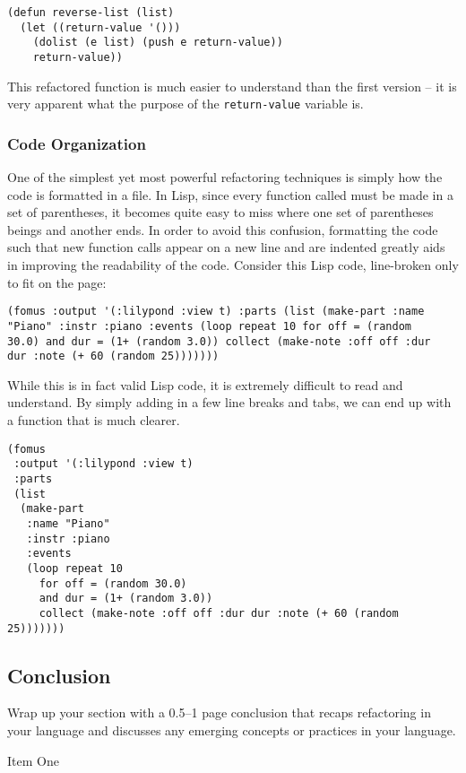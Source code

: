 \documentclass{article}
\begin{document}
\begin{verbatim}
(defun reverse-list (list)
  (let ((return-value '()))
    (dolist (e list) (push e return-value))
    return-value))
\end{verbatim}

This refactored function is much easier to understand than the first version -- it is very apparent what the purpose of the \verb!return-value! variable is.

\subsubsection{Code Organization}

One of the simplest yet most powerful refactoring techniques is simply how the code is formatted in a file. In Lisp, since every function called must be made in a set of parentheses, it becomes quite easy to miss where one set of parentheses beings and another ends. In order to avoid this confusion, formatting the code such that new function calls appear on a new line and are indented greatly aids in improving the readability of the code. Consider this Lisp code, line-broken only to fit on the page:

\begin{verbatim}
(fomus :output '(:lilypond :view t) :parts (list (make-part :name 
"Piano" :instr :piano :events (loop repeat 10 for off = (random 
30.0) and dur = (1+ (random 3.0)) collect (make-note :off off :dur 
dur :note (+ 60 (random 25)))))))
\end{verbatim}

While this is in fact valid Lisp code, it is extremely difficult to read and understand. By simply adding in a few line breaks and tabs, we can end up with a function that is much clearer.

\begin{verbatim}
(fomus
 :output '(:lilypond :view t)
 :parts
 (list
  (make-part
   :name "Piano"
   :instr :piano
   :events
   (loop repeat 10
	 for off = (random 30.0)
	 and dur = (1+ (random 3.0))
	 collect (make-note :off off :dur dur :note (+ 60 (random 25)))))))
\end{verbatim}

\subsection{Conclusion}

Wrap up your section with a 0.5--1 page conclusion that recaps refactoring in your language and discusses any emerging concepts or practices in your language.

\begin{thebibliography}{9}
 Item One
\end{thebibliography}
\end{document}
